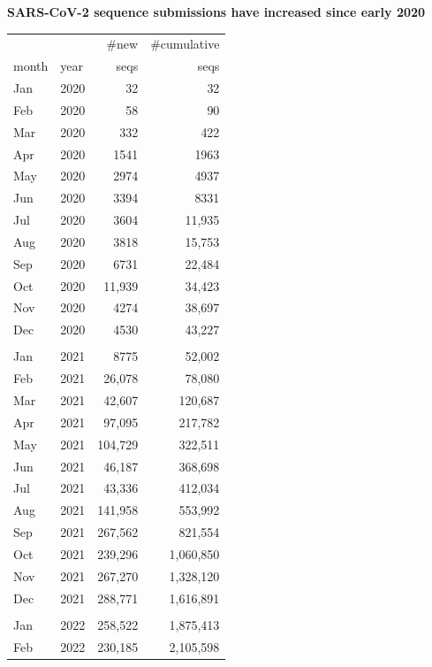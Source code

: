 \documentclass[landscape]{slides}
\begin{document}
\begin{slide}
\begin{center}
\normalsize{\textbf{SARS-CoV-2 sequence submissions have increased since early 2020}}
\end{center}

\tiny
\begin{center}
\begin{tabular}{llrr}
          &          &\#new     &\#cumulative\\
month     &year      &seqs      &seqs      \\ \hline
Jan       & 2020     &32        &32        \\ 
Feb       & 2020     &58        &90        \\ 
Mar       & 2020     &332       &422       \\ 
Apr       & 2020     &1541      &1963      \\ 
May       & 2020     &2974      &4937      \\ 
Jun       & 2020     &3394      &8331      \\ 
Jul       & 2020     &3604      &11,935    \\ 
Aug       & 2020     &3818      &15,753    \\ 
Sep       & 2020     &6731      &22,484    \\ 
Oct       & 2020     &11,939    &34,423    \\ 
Nov       & 2020     &4274      &38,697    \\ 
Dec       & 2020     &4530      &43,227    \\ 
& & & \\
Jan       & 2021     &8775      &52,002    \\ 
Feb       & 2021     &26,078    &78,080    \\ 
Mar       & 2021     &42,607    &120,687   \\ 
Apr       & 2021     &97,095    &217,782   \\ 
May       & 2021     &104,729   &322,511   \\ 
Jun       & 2021     &46,187    &368,698   \\ 
Jul       & 2021     &43,336    &412,034   \\ 
Aug       & 2021     &141,958   &553,992   \\ 
Sep       & 2021     &267,562   &821,554   \\ 
Oct       & 2021     &239,296   &1,060,850 \\ 
Nov       & 2021     &267,270   &1,328,120 \\ 
Dec       & 2021     &288,771   &1,616,891 \\ 
& & & \\
Jan       & 2022     &258,522   &1,875,413 \\ 
Feb       & 2022     &230,185   &2,105,598 \\ 
\end{tabular}
\end{center}

\vfill
\end{slide}
\end{document}
